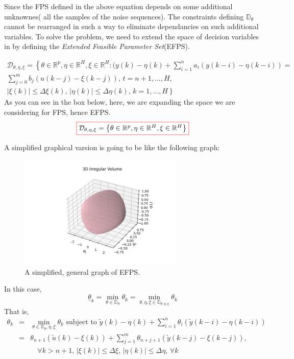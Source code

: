 Since the FPS defined in the above equation depends on some additional unknownes( all the samples of the noise sequences). The constraints defining \(\mathbb{D}_\theta\) cannot be rearranged in such a way to eliminate dependancies on such additional variables. To solve the problem, we need to extend the space of decision variables in by defining the \textit{Extended Feasible Parameter Set}(EFPS).

\[
\begin{array}{c}
\mathcal{D}_{\theta,\eta,\xi} = \left\{ \theta \in \mathbb{R}^p, \eta \in \mathbb{R}^H, \xi \in \mathbb{R}^H : \right.
(y(k) - \eta(k) + \sum_{i=1}^{n} a_i ( y(k-i) - \eta(k-i)) = \\[2ex]
\sum_{j=0}^{m} b_j ( u(k-j) - \xi(k-j) ), \, t = n+1,\dots,H, \\[2ex]
|\xi(k)| \leq \Delta \xi(k), \, |\eta(k)| \leq \Delta \eta(k), \, k = 1,\dots,H \left.\right\}
\end{array}
\]
As you can see in the box below, here, we are expanding the space we are considering for FPS, hence EFPS.
\begin{align}
\fcolorbox{red}{white}{$\mathcal{D}_{\theta,\eta,\xi} = \left\{ \theta \in \mathbb{R}^p, \eta \in \mathbb{R}^H, \xi \in \mathbb{R}^H\right\}$}
\end{align}

A simplified graphical varsion is going to be like the following graph:

\begin{figure}[htbp]  %
    \centering
    \includegraphics[width=0.7\textwidth]{images/EFPS.png}
    \caption{A simplified, general graph of EFPS.}
    \label{fig:EFPS}
\end{figure}

In this case,
\[
\underline{\theta}_k = \min\limits_{\theta \in \mathbb{D}_\theta} \theta_k = \min\limits_{\theta, \eta, \xi \in \mathbb{D}_{\theta, \eta, \xi}} \theta_k
\]
That is,
\[
\begin{array}{rcl}
\theta_k & = & \min_{\theta \in \mathbb{D}_\theta, \eta, \xi} \theta_k \text{ subject to } \tilde{y}(k) - \eta(k) + \sum_{i=1}^{n} \theta_i(\tilde{y}(k-i) - \eta(k-i)) \\[1ex]
& = & \theta_{n+1}(\tilde{u}(k) - \xi(k)) + \sum_{j=1}^{m} \theta_{n+j+1}(\tilde{y}(k-j) - \xi(k-j)), \\[1ex]
& & \quad \forall k > n+1, \, |\xi(k)| \leq \Delta \xi, \, |\eta(k)| \leq \Delta \eta, \, \forall k
\end{array}
\]

